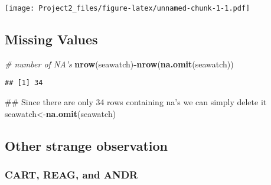 \documentclass[]{article}
\newenvironment{Shaded}{\begin{snugshade}}{\end{snugshade}}
\newcommand{\KeywordTok}[1]{\textcolor[rgb]{0.13,0.29,0.53}{\textbf{#1}}}
\newcommand{\CommentTok}[1]{\textcolor[rgb]{0.56,0.35,0.01}{\textit{#1}}}
\newcommand{\OperatorTok}[1]{\textcolor[rgb]{0.81,0.36,0.00}{\textbf{#1}}}
\newcommand{\NormalTok}[1]{#1}
\begin{document}
\texttt{[image: Project2\_files/figure-latex/unnamed-chunk-1-1.pdf]}

\begin{Shaded}
\end{Shaded}

\subsection{Missing Values}\label{missing-values}

\begin{Shaded}
\begin{Highlighting}[]
\CommentTok{# number of NA's}
\KeywordTok{nrow}\NormalTok{(seawatch)}\OperatorTok{-}\KeywordTok{nrow}\NormalTok{(}\KeywordTok{na.omit}\NormalTok{(seawatch))}
\end{Highlighting}
\end{Shaded}

\begin{verbatim}
## [1] 34
\end{verbatim}

\begin{Shaded}
\begin{Highlighting}[]
\NormalTok{## Since there are only 34 rows containing na's we can simply delete it}
\NormalTok{seawatch<-}\KeywordTok{na.omit}\NormalTok{(seawatch)}
\end{Highlighting}
\end{Shaded}

\subsection{Other strange observation}\label{other-strange-observation}

\subsubsection{CART, REAG, and ANDR}\label{cart-reag-and-andr}
\end{document}
